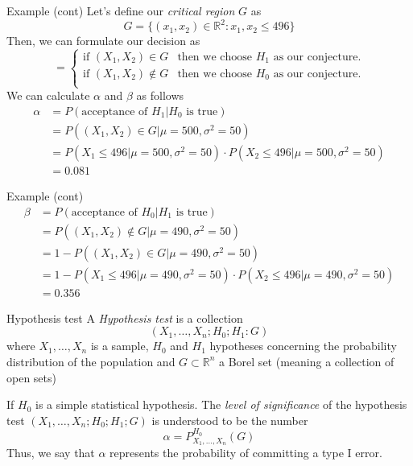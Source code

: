 \documentclass{beamer}
\begin{document}
\begin{frame}{Example (cont)}
	Let's define our \textit{critical region} $G$ as 
	\begin{equation*}
		G=\{(x_1,x_2)\in \mathbb{R}^2: x_1,x_2 \le 496\}
	\end{equation*}
	Then, we can formulate our decision as
	\begin{equation*}
		=
		\begin{cases}
			\text{if }(X_1,X_2) \in G & \text{then we choose $H_1$ as our conjecture}.\\
			\text{if }(X_1,X_2) \notin G & \text{then we choose $H_0$ as our conjecture}.\\
		\end{cases}	
		\end{equation*}
	We can calculate $\alpha$ and $\beta$ as follows
	\begin{equation*}
		\begin{split}
			\alpha& = P(\text{acceptance of }H_1 | H_0\text{ is true}) \\ 
			& = P((X_1,X_2)\in G| \mu=500, \sigma^2=50) \\
			&=  P(X_1\le 496| \mu=500, \sigma^2=50) \cdot  P(X_2\le 496| \mu=500, \sigma^2=50)\\
			&= 0.081
		\end{split}
	\end{equation*}
\end{frame}

\begin{frame}{Example (cont)}
	\begin{equation*}
		\begin{split}
			\beta& = P(\text{acceptance of }H_0 | H_1\text{ is true}) \\ 
			& = P((X_1,X_2)\notin G| \mu=490, \sigma^2=50) \\
			&= 1-P((X_1,X_2)\in G| \mu=490, \sigma^2=50) \\
			&=  1-P(X_1\le 496| \mu=490, \sigma^2=50) \cdot  P(X_2\le 496| \mu=490, \sigma^2=50)\\
			&= 0.356
		\end{split}
	\end{equation*}
\end{frame}

\begin{frame}{Hypothesis test}
	A \textit{Hypothesis test} is a collection
	\begin{equation*}
		(X_1,\ldots, X_n; H_0; H_1: G)
	\end{equation*}
 where $X_1,\ldots, X_n$ is a sample, $H_0$ and $H_1$ hypotheses concerning the probability distribution of the population and $G\subset \mathbb{R}^n$ a Borel set (meaning a collection of open sets)
 
 If $H_0$ is a simple statistical hypothesis. The \textit{level of significance} of the hypothesis test $(X_1,\ldots, X_n; H_0;H_1;G)$ is understood to be the number
 \begin{equation*}
 	\alpha = P_{X_1,\ldots, X_n}^{H_0}(G)
 \end{equation*}
Thus, we say that $\alpha$ represents the probability of committing a type I error.
\end{frame}
\end{document}
